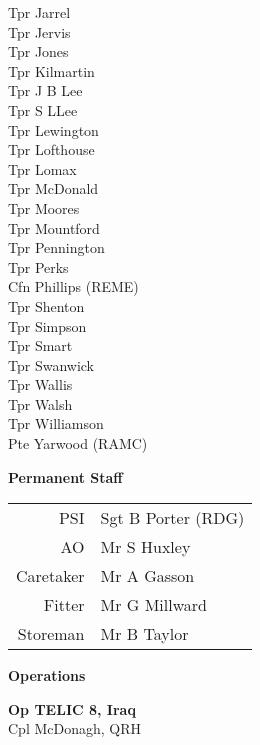 \begin{multicols}{3}
  Tpr Jarrel \\
  Tpr Jervis \\
  Tpr Jones \\
  Tpr Kilmartin \\
  Tpr J B Lee \\
  Tpr S LLee \\
  Tpr Lewington \\
  Tpr Lofthouse \\
  Tpr Lomax \\
  Tpr McDonald \\
  Tpr Moores \\
  Tpr Mountford \\
  Tpr Pennington \\
  Tpr Perks \\
  Cfn Phillips (REME) \\
  Tpr Shenton \\
  Tpr Simpson \\
  Tpr Smart \\
  Tpr Swanwick \\
  Tpr Wallis \\
  Tpr Walsh \\
  Tpr Williamson \\
  Pte Yarwood (RAMC) \\
\end{multicols}

\begin{center}
  \Large
  \textbf{Permanent Staff}
\end{center}

\begin{center}
  \begin{tabular}{rl}
    PSI & Sgt B Porter (RDG) \\
    AO & Mr S Huxley \\
    Caretaker & Mr A Gasson \\
    Fitter & Mr G Millward \\
    Storeman & Mr B Taylor \\
  \end{tabular}
\end{center}

\vspace*{5mm}

\begin{center}
  \Large
  \textbf{Operations}
\end{center}

\begin{center}
  \noindent
  \textbf{Op TELIC 8, Iraq} \\
  Cpl McDonagh, QRH \\
\end{center}

